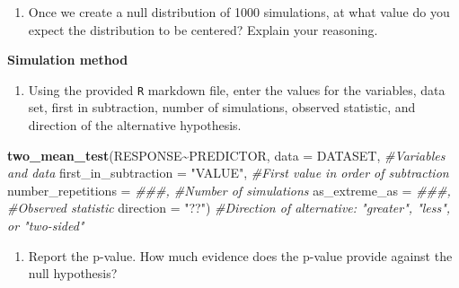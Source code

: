 \documentclass[
]{report}
\newenvironment{Shaded}{\begin{snugshade}}{\end{snugshade}}
\newcommand{\CommentTok}[1]{\textcolor[rgb]{0.56,0.35,0.01}{\textit{#1}}}
\newcommand{\DataTypeTok}[1]{\textcolor[rgb]{0.13,0.29,0.53}{#1}}
\newcommand{\KeywordTok}[1]{\textcolor[rgb]{0.13,0.29,0.53}{\textbf{#1}}}
\newcommand{\NormalTok}[1]{#1}
\newcommand{\OperatorTok}[1]{\textcolor[rgb]{0.81,0.36,0.00}{\textbf{#1}}}
\newcommand{\StringTok}[1]{\textcolor[rgb]{0.31,0.60,0.02}{#1}}
\providecommand{\tightlist}{%
  \setlength{\itemsep}{0pt}\setlength{\parskip}{0pt}}
\begin{document}
\vspace{1in}

\begin{enumerate}
\def\labelenumi{\arabic{enumi}.}
\setcounter{enumi}{13}
\tightlist
\item
  Once we create a null distribution of 1000 simulations, at what value do you expect the distribution to be centered? Explain your reasoning.
\end{enumerate}

\vspace{1in}

\textbf{Simulation method}

\begin{enumerate}
\def\labelenumi{\arabic{enumi}.}
\setcounter{enumi}{14}
\tightlist
\item
  Using the provided \texttt{R} markdown file, enter the values for the variables, data set, first in subtraction, number of simulations, observed statistic, and direction of the alternative hypothesis.
\end{enumerate}

\begin{Shaded}
\begin{Highlighting}[]
\KeywordTok{two\_mean\_test}\NormalTok{(RESPONSE}\OperatorTok{\textasciitilde{}}\NormalTok{PREDICTOR, }\DataTypeTok{data =}\NormalTok{ DATASET,  }\CommentTok{\#Variables and data}
                    \DataTypeTok{first\_in\_subtraction =} \StringTok{"VALUE"}\NormalTok{, }\CommentTok{\#First value in order of subtraction}
                    \DataTypeTok{number\_repetitions =} \CommentTok{\#\#\#,  \#Number of simulations}
                    \DataTypeTok{as\_extreme\_as =} \CommentTok{\#\#\#,  \#Observed statistic}
                    \DataTypeTok{direction =} \StringTok{"??"}\NormalTok{)  }\CommentTok{\#Direction of alternative: "greater", "less", or "two{-}sided"}
\end{Highlighting}
\end{Shaded}

\vspace{1in}

\begin{enumerate}
\def\labelenumi{\arabic{enumi}.}
\setcounter{enumi}{15}
\tightlist
\item
  Report the p-value. How much evidence does the p-value provide against the null hypothesis?
\end{enumerate}

\vspace{1in}
\end{document}
